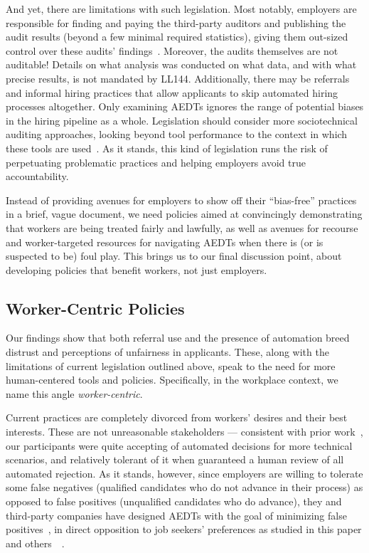 And yet, there are limitations with such legislation. Most notably, employers are responsible for finding and paying the third-party auditors and publishing the audit results (beyond a few minimal required statistics), giving them out-sized control over these audits' findings~\cite{wright2024null, groves2024auditing}. Moreover, the audits themselves are not auditable! Details on what analysis was conducted on what data, and with what precise results, is not mandated by LL144. Additionally, there may be referrals and informal hiring practices that allow applicants to skip automated hiring processes altogether. Only examining AEDTs ignores the range of potential biases in the hiring pipeline as a whole. Legislation should consider more sociotechnical auditing approaches, looking beyond tool performance to the context in which these tools are used~\cite{lam2023STA}. As it stands, this kind of legislation runs the risk of perpetuating problematic practices and helping employers avoid true accountability. 

Instead of providing avenues for employers to show off their ``bias-free'' practices in a brief, vague document, we need policies aimed at convincingly demonstrating that workers are being treated fairly and lawfully, as well as avenues for recourse and worker-targeted resources for navigating AEDTs when there is (or is suspected to be) foul play. This brings us to our final discussion point, about developing policies that benefit workers, not just employers. 

\subsection{Worker-Centric Policies}
Our findings show that both referral use and the presence of automation breed distrust and perceptions of unfairness in applicants. These, along with the limitations of current legislation outlined above, speak to the need for more human-centered tools and policies. Specifically, in the workplace context, we name this angle \textit{worker-centric}. 

Current practices are completely divorced from workers' desires and their best interests. These are not unreasonable stakeholders --- consistent with prior work~\cite{lee2018understanding, zhang2022examining, gonzalez2022allying}, our participants were quite accepting of automated decisions for more technical scenarios, and relatively tolerant of it when guaranteed a human review of all automated rejection. As it stands, however, since employers are willing to tolerate some false negatives (qualified candidates who do not advance in their process) as opposed to false positives (unqualified candidates who do advance), they and third-party companies have designed AEDTs with the goal of minimizing false positives~\cite{friedrich1993primary}, in direct opposition to job seekers' preferences as studied in this paper and others~~\cite{morse2021ends, roulin2014interviewers}. 

